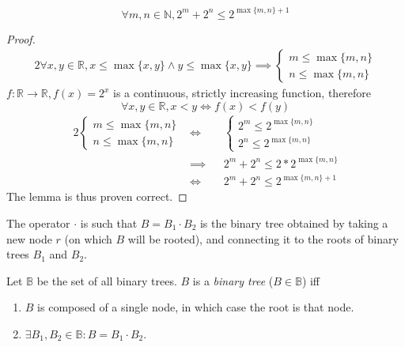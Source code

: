 \documentclass[docid=CA01]{tcom_CA}
\begin{document}
\setcounter{chapter}{0}
\begin{lemma} \label{lem:CA01_max}
\begin{equation*}
	\forall m,n \in \mathbb{N}, 2^m+2^n \leq 2^{\max \{m,n\} +1}
\end{equation*}
\end{lemma}
\begin{proof}
\begin{alignat*}{2}
	\forall x,y \in \mathbb{R}, x \leq \max \{x,y\} \wedge y \leq \max \{x,y\}
	\implies \begin{cases}
		m \leq \max \{ m,n\}\\
		n \leq \max \{ m,n\}
	\end{cases}
\end{alignat*}
$f \colon \mathbb{R} \rightarrow \mathbb{R}, f(x)=2^x$ is a continuous, strictly increasing function, therefore
\begin{equation*}
	\forall x,y \in \mathbb{R}, x<y \iff f(x) < f(y)
\end{equation*}
\begin{alignat*}{2}
	\begin{cases}
		m \leq \max \{ m,n\}\\
		n \leq \max \{ m,n\}
	\end{cases}
	&\iff &&
	\begin{cases}
		2^m \leq 2^{\max \{ m,n\}}\\
		2^n \leq 2^{\max \{ m,n\}}
	\end{cases}\\
	&\implies && 2^m+2^n \leq 2 * 2^{\max \{m,n\}}\\
	&\iff     && 2^m+2^n \leq 2^{\max \{m,n\} +1}
\end{alignat*}
The lemma is thus proven correct.
\end{proof}
\begin{definition}
	The operator $\cdot$ is such that $B=B_1 \cdot B_2$ is the binary tree obtained by taking a new node $r$ (on which $B$ will be rooted), and connecting it to the roots of binary trees $B_1$ and $B_2$.
\end{definition}
\begin{definition}
Let $\mathbb{B}$ be the set of all binary trees.
$B$ is a \textit{binary tree} ($B \in \mathbb{B}$) iff
\begin{enumerate}
	\item \label{def:BT1} $B$ is composed of a single node, in which case the root is that node.
	\item \label{def:BT2} $\exists B_1,B_2 \in \mathbb{B} \colon B=B_1 \cdot B_2$.
\end{enumerate}
\end{definition}
\end{document}
